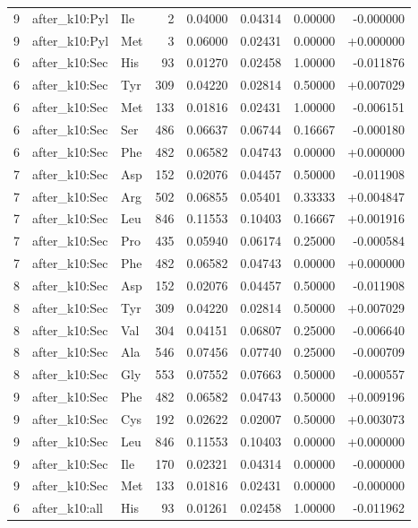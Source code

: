 \begin{longtable}{r l l r r r r r}
9 & after\_k10:Pyl & Ile & 2 & 0.04000 & 0.04314 & 0.00000 & -0.000000 \\
9 & after\_k10:Pyl & Met & 3 & 0.06000 & 0.02431 & 0.00000 & +0.000000 \\
6 & after\_k10:Sec & His & 93 & 0.01270 & 0.02458 & 1.00000 & -0.011876 \\
6 & after\_k10:Sec & Tyr & 309 & 0.04220 & 0.02814 & 0.50000 & +0.007029 \\
6 & after\_k10:Sec & Met & 133 & 0.01816 & 0.02431 & 1.00000 & -0.006151 \\
6 & after\_k10:Sec & Ser & 486 & 0.06637 & 0.06744 & 0.16667 & -0.000180 \\
6 & after\_k10:Sec & Phe & 482 & 0.06582 & 0.04743 & 0.00000 & +0.000000 \\
7 & after\_k10:Sec & Asp & 152 & 0.02076 & 0.04457 & 0.50000 & -0.011908 \\
7 & after\_k10:Sec & Arg & 502 & 0.06855 & 0.05401 & 0.33333 & +0.004847 \\
7 & after\_k10:Sec & Leu & 846 & 0.11553 & 0.10403 & 0.16667 & +0.001916 \\
7 & after\_k10:Sec & Pro & 435 & 0.05940 & 0.06174 & 0.25000 & -0.000584 \\
7 & after\_k10:Sec & Phe & 482 & 0.06582 & 0.04743 & 0.00000 & +0.000000 \\
8 & after\_k10:Sec & Asp & 152 & 0.02076 & 0.04457 & 0.50000 & -0.011908 \\
8 & after\_k10:Sec & Tyr & 309 & 0.04220 & 0.02814 & 0.50000 & +0.007029 \\
8 & after\_k10:Sec & Val & 304 & 0.04151 & 0.06807 & 0.25000 & -0.006640 \\
8 & after\_k10:Sec & Ala & 546 & 0.07456 & 0.07740 & 0.25000 & -0.000709 \\
8 & after\_k10:Sec & Gly & 553 & 0.07552 & 0.07663 & 0.50000 & -0.000557 \\
9 & after\_k10:Sec & Phe & 482 & 0.06582 & 0.04743 & 0.50000 & +0.009196 \\
9 & after\_k10:Sec & Cys & 192 & 0.02622 & 0.02007 & 0.50000 & +0.003073 \\
9 & after\_k10:Sec & Leu & 846 & 0.11553 & 0.10403 & 0.00000 & +0.000000 \\
9 & after\_k10:Sec & Ile & 170 & 0.02321 & 0.04314 & 0.00000 & -0.000000 \\
9 & after\_k10:Sec & Met & 133 & 0.01816 & 0.02431 & 0.00000 & -0.000000 \\
6 & after\_k10:all & His & 93 & 0.01261 & 0.02458 & 1.00000 & -0.011962 \\

\end{longtable}
